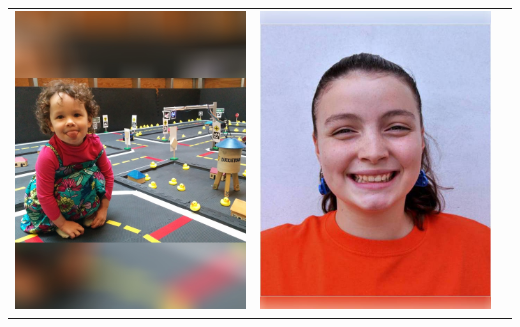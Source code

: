 \documentclass[landscape,a0paper,fontscale=0.292]{baposter}
\begin{document}
\begin{poster}
{\begin{center}
\begin{tabularx}{\linewidth}{X X X}
{\centering \includegraphics[width=0.8\linewidth]{ingrid.jpg}}&
{\centering \includegraphics[width=0.8\linewidth]{valeria.jpg}}\\ 


\end{tabularx}
\end{center}}
\end{poster}
\end{document}
